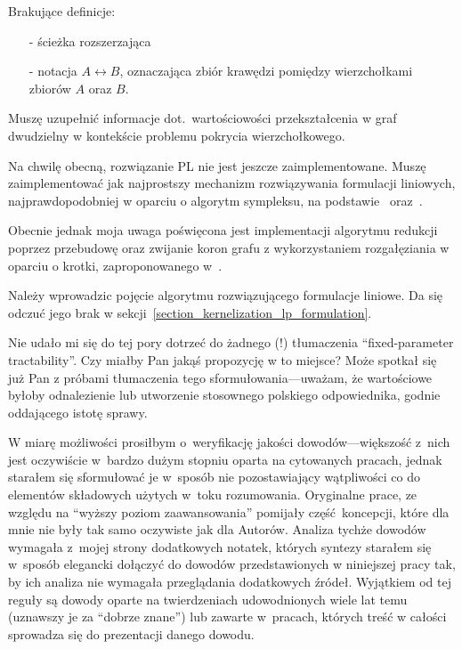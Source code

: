 \begin{note}
  Brakujące definicje:
  \begin{itemize}
    \item[-] ścieżka rozszerzająca
    \item[-] notacja $A \leftrightarrow B$, oznaczająca zbiór krawędzi pomiędzy
      wierzchołkami zbiorów $A$ oraz $B$.
  \end{itemize}
\end{note}
\begin{note}
  Muszę uzupełnić informacje dot.\ wartościowości przekształcenia w graf
  dwudzielny w kontekście problemu pokrycia wierzchołkowego.
\end{note}
\begin{note}
  Na chwilę obecną, rozwiązanie PL nie jest jeszcze zaimplementowane.
  Muszę zaimplementować jak najprostszy mechanizm rozwiązywania formulacji
  liniowych, najprawdopodobniej w oparciu o algorytm sympleksu, na
  podstawie~\cite{sedgewick11} oraz~\cite{Cormen:2001:IA:580470}.


  Obecnie jednak moja uwaga poświęcona jest implementacji algorytmu redukcji 
  poprzez przebudowę oraz zwijanie koron grafu z wykorzystaniem rozgałęziania w
  oparciu o krotki, zaproponowanego w~\cite{ImprovedBounds10}. 
\end{note}
\begin{note}
  Należy wprowadzic pojęcie algorytmu rozwiązującego formulacje liniowe. 
  Da się odczuć jego brak w sekcji~\ref{section_kernelization_lp_formulation}.
\end{note}
\begin{note}
  Nie udało mi się do tej pory dotrzeć do żadnego (!) tłumaczenia
  ``fixed-parameter tractability''.
  Czy miałby Pan jakąś propozycję w to miejsce?
  Może spotkał się już Pan z próbami tłumaczenia tego sformułowania---uważam, że
  wartościowe byłoby odnalezienie lub utworzenie stosownego polskiego
  odpowiednika, godnie oddającego istotę sprawy. 
\end{note}
\begin{note}
  W miarę możliwości prosiłbym o~weryfikację jakości dowodów---większość z~nich
  jest oczywiście w~bardzo dużym stopniu oparta na cytowanych pracach, jednak
  starałem się sformułować je w~sposób nie pozostawiający wątpliwości co do
  elementów składowych użytych w~toku rozumowania.
  Oryginalne prace, ze względu na ``wyższy poziom zaawansowania'' pomijały
  część~koncepcji, które dla mnie nie były tak samo oczywiste jak dla Autorów.
  Analiza tychże dowodów wymagała z~mojej strony dodatkowych notatek, których
  syntezy starałem się w~sposób elegancki dołączyć do dowodów przedstawionych w
  niniejszej pracy tak, by ich analiza nie wymagała przeglądania dodatkowych
  źródeł.
  Wyjątkiem od tej reguły są dowody oparte na twierdzeniach udowodnionych wiele
  lat temu (uznawszy je za ``dobrze znane'') lub zawarte w~pracach, których 
  treść w całości sprowadza się do prezentacji danego dowodu.
\end{note}
